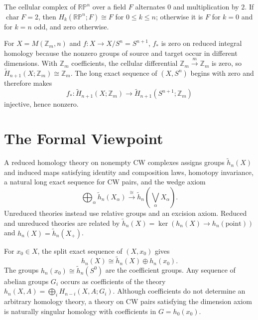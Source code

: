 \begin{example}
\label{ex:homology-rpn-field-coefficients}
The cellular complex of $\mathbb{RP}^n$ over a field $F$ alternates $0$ and multiplication by $2$.  If $\operatorname{char}F=2$, then $H_k(\mathbb{RP}^n;F)\cong F$ for $0\leq k\leq n$; otherwise it is $F$ for $k=0$ and for $k=n$ odd, and zero otherwise.
\end{example}

\begin{example}
\label{ex:homology-moore-space-quotient}
For $X=M(\mathbb{Z}_m,n)$ and $f:X\to X/S^n=S^{n+1}$, $f_*$ is zero on
reduced integral homology because the nonzero groups of source and target occur
in different dimensions. With $\mathbb{Z}_m$ coefficients, the cellular
differential $\mathbb{Z}_m\xrightarrow{m}\mathbb{Z}_m$ is zero, so
$\widetilde H_{n+1}(X;\mathbb{Z}_m)\cong\mathbb{Z}_m$. The long exact sequence
of $(X,S^n)$ begins with zero and therefore makes
\[
f_*:\widetilde H_{n+1}(X;\mathbb{Z}_m)
\longrightarrow\widetilde H_{n+1}(S^{n+1};\mathbb{Z}_m)
\]
injective, hence nonzero.
\end{example}

\section{The Formal Viewpoint}\label{sec:formal-viewpoint}

A reduced homology theory on nonempty CW complexes assigns groups $\widetilde h_n(X)$ and induced maps satisfying identity and composition laws, homotopy invariance, a natural long exact sequence for CW pairs, and the wedge axiom
\[
\bigoplus_\alpha\widetilde h_n(X_\alpha)\xrightarrow{\cong}\widetilde h_n\left(\bigvee_\alpha X_\alpha\right).
\]
Unreduced theories instead use relative groups and an excision axiom.  Reduced and unreduced theories are related by $\widetilde h_n(X)=\ker(h_n(X)\to h_n(\mathrm{point}))$ and $h_n(X)=\widetilde h_n(X_+)$.

For $x_0\in X$, the split exact sequence of $(X,x_0)$ gives
\[
h_n(X)\cong\widetilde h_n(X)\oplus h_n(x_0).
\]
The groups $h_n(x_0)\cong\widetilde h_n(S^0)$ are the coefficient groups.
Any sequence of abelian groups $G_i$ occurs as coefficients of the theory
$h_n(X,A)=\bigoplus_i H_{n-i}(X,A;G_i)$. Although coefficients do not determine
an arbitrary homology theory, a theory on CW pairs satisfying the dimension
axiom is naturally singular homology with coefficients in $G=h_0(x_0)$.


